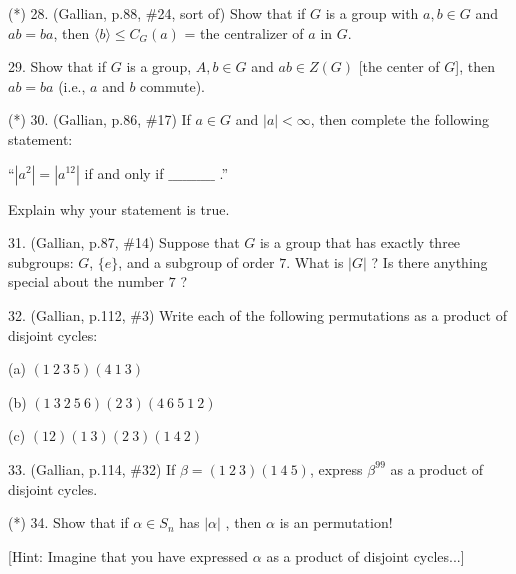 \documentclass[12pt]{article}
\begin{document}
\begin{description}

\item{(*) 28.} (Gallian, p.88, \#24, sort of) Show that if $G$ is a group with $a,b\in G$
and $ab=ba$, then $\langle b\rangle\leq C_G(a)$ = the centralizer of $a$ in $G$.

\msk

\item{29.} Show that if $G$ is a group, $A,b\in G$ and $ab\in Z(G)$ [the center of $G$],
then $ab=ba$ (i.e., $a$ and $b$ commute).

\msk

\item{(*) 30.} (Gallian, p.86, \#17) If $a\in G$ and $|a|<\infty$, then 
complete the following statement: 

\ssk

\item{\spc} ``$|a^2| = |a^{12}|$ if and only if $\_\_\_\_\_\_\_\_\_\_$ .''

\ssk

\item{\spc} Explain why your statement is true.

\msk

\item{31.} (Gallian, p.87, \#14) Suppose that $G$ is a  group that has exactly 
three subgroups: $G$, $\{e\}$, and a subgroup of order $7$. What is $|G|$ ?
Is there anything special about the number $7$ ?

\msk


\item{32.} (Gallian, p.112, \#3) Write each of the following permutations as a product of disjoint
cycles:

\item{\spc} (a) $(1\ 2\ 3\ 5)(4\ 1\ 3)$

\item{\spc} (b) $(1\ 3\ 2\ 5\ 6)(2\ 3)(4\ 6\ 5\ 1\ 2)$

\item{\spc} (c) $(1 2)(1\ 3)(2\ 3)(1\ 4\ 2)$

\msk

\item{33.} (Gallian, p.114, \#32) If $\beta=(1\ 2\ 3)(1\ 4\ 5)$, express $\beta^{99}$ as a 
product of disjoint cycles.

\msk

\item{(*) 34.} Show that if $\alpha\in S_n$ has $|\alpha|$ , then $\alpha$ is
an  permutation!

\ssk

\item{\spc} [Hint: Imagine that you have expressed $\alpha$ as a product of disjoint cycles...]


\end{description}
\vfill
\end{document}
